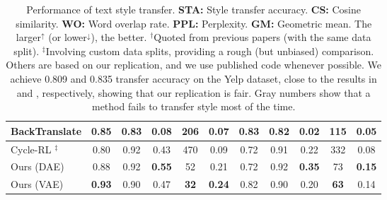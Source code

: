 \documentclass[11pt,a4paper]{article}
\begin{document}
\begin{table}[!t]
{\begin{tabular}{|l||c|c|c|c|c||c|c|c|c|c| }
			BackTranslate \cite{prabhumoye2018style}   & 0.85                                        & 0.83                                         & 0.08                   & 206                       & 0.07                   & \textbf{0.83}              & 0.82                       & 0.02                   & 115                       & 0.05                       \\ \hline
			Cycle-RL \cite{xu2018unpaired} $^\ddag$    & 0.80                                        & 0.92                                         & 0.43                   & 470                       & 0.09                   & 0.72                       & 0.91                       & {0.22}                 & 332                       & 0.08                       \\ \hline\hline
			Ours (DAE)                                 & 0.88                                        & 0.92                                         & \textbf{0.55}          & 52                        & 0.21                   & 0.72                       & 0.92                       & \textbf{0.35}          & 73                        & \textbf{0.15}              \\ \hline
			Ours (VAE)                                 & \textbf{0.93}                               & 0.90                                         & 0.47                   & \textbf{32}               & \textbf{0.24}          & 0.82                       & 0.90                       & 0.20                   & \textbf{63}               & 0.14                       \\ \hline
		\end{tabular}}
	\vspace{-.2cm}
	\caption{Performance of text style transfer. \textbf{STA:} Style transfer accuracy. \textbf{CS:} Cosine similarity. \textbf{WO:} Word overlap rate. \textbf{PPL:} Perplexity. \textbf{GM:} Geometric mean. The larger$^\uparrow$ (or lower$^\downarrow$), the better.  $^\dag$Quoted from previous papers (with the same data split). $^\ddag$Involving custom data splits, providing a rough (but unbiased) comparison. Others are based on our replication, and we use published code whenever possible. We achieve 0.809 and 0.835 transfer accuracy on the Yelp dataset, close to the results in \citet{shen2017style} and \citet{zhao2018adversarially}, respectively, showing that our replication is fair. Gray numbers show that a method fails to transfer style most of the time.}\vspace{-.2cm}
	\label{tab:comparison-previous}
\end{table}
\end{document}
